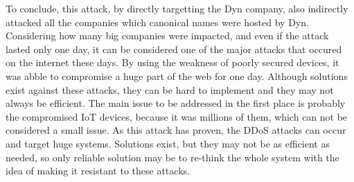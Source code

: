 \documentclass[a4paper,man,natbib,12]{apa6}
\begin{document}
\qquad To conclude, this attack, by directly targetting the Dyn company, also indirectly attacked all the companies which canonical names were hosted by Dyn. Considering how many big companies were impacted, and even if the attack lasted only one day, it can be considered one of the major attacks that occured on the internet these days. By using the weakness of poorly secured devices, it was abble to compromise a huge part of the web for one day. Although solutions exist against these attacks, they can be hard to implement and they may not always be efficient. The main issue to be addressed in the first place is probably the compromised IoT devices, because it was millions of them, which can not be considered a small issue. As this attack has proven, the DDoS attacks can occur and target huge systems. Solutions exist, but they may not be as efficient as needed, so only reliable solution may be to re-think the whole system with the idea of making it resistant to these attacks.


\end{document}
